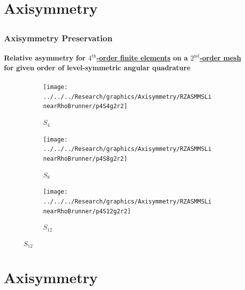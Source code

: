 \documentclass[compress,t]{beamer}
\begin{document}
\section{Axisymmetry}
\subsection{}

\begin{frame}
\frametitle{Axisymmetry Preservation}
\framesubtitle{Relative asymmetry for \underline{$4^\text{th}$-order finite elements} on a \underline{$2^\text{nd}$-order mesh} for given order of level-symmetric angular quadrature}

\begin{figure}
\centering
\begin{subfigure}{0.33\textwidth}
\centering
\texttt{[image: ../../../Research/graphics/Axisymmetry/RZASMMSLinearRhoBrunner/p4S4g2r2]}
\caption{$S_4$}
\end{subfigure}%
\begin{subfigure}{0.33\textwidth}
\centering
\texttt{[image: ../../../Research/graphics/Axisymmetry/RZASMMSLinearRhoBrunner/p4S8g2r2]}
\caption{$S_8$}
\end{subfigure}%
\begin{subfigure}{0.33\textwidth}
\centering
\texttt{[image: ../../../Research/graphics/Axisymmetry/RZASMMSLinearRhoBrunner/p4S12g2r2]}
\caption{$S_{12}$}
\end{subfigure}
\end{figure}

\end{frame}

\section{Axisymmetry}
\subsection{}
\end{document}
